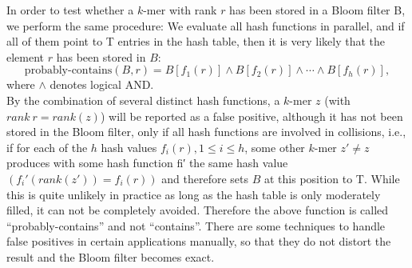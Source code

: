 In order to test whether a $k$-mer with rank $r$ has been stored in a Bloom filter B, we perform the same procedure: We evaluate all hash functions in parallel, and if all of them point to T entries in the hash table, then it is very likely that the element $r$ has been stored in $B$:
\[
    \text{probably-contains}(B, r) = B[f_1 (r)] \land B[f_2 (r)] \land \cdots \land B[f_h (r)],
\]
where $\land$ denotes logical AND. \\ \newline
By the combination of several distinct hash functions, a $k$-mer $z$ (with $rank\ r = rank(z)$) will be reported as a false positive, although it has not been stored in the Bloom filter, only if all hash functions are involved in collisions, i.e., if for each of the $h$ hash values $f_i (r), 1 \leq i \leq h$, some other $k$-mer $z' \neq z$ produces with some hash function fi′ the same hash value $(f_i' (rank(z' )) = f_i (r))$ and therefore sets $B$ at this position to T. While this is quite unlikely in practice as long as the hash table is only moderately filled, it can not be completely avoided.
Therefore the above function is called ``probably-contains'' and not ``contains''.
There are some techniques to handle false positives in certain applications manually, so that they do not distort
the result and the Bloom filter becomes exact. \cite{seqan_skript}

